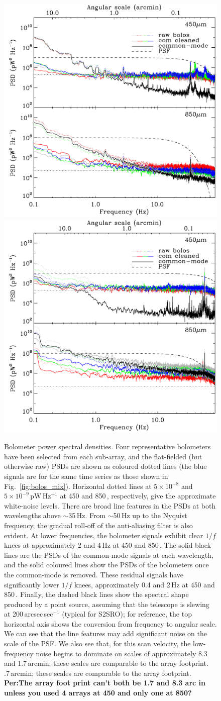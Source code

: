 \documentclass[useAMS,usenatbib,nofootinbib]{mn2e}
\begin{document}
\begin{figure}
\centering
\includegraphics[width=0.49\linewidth]{pspec_s2sro.pdf}
\includegraphics[width=0.49\linewidth]{pspec.pdf}
\caption{Bolometer power spectral densities. Four representative
  bolometers have been selected from each sub-array, and the
  flat-fielded (but otherwise raw) PSDs are shown as coloured dotted
  lines (the blue signals are for the same time series as those shown
  in Fig.~\ref{fig:bolos_mix}). Horizontal dotted lines at $5 \times
  10^{-8}$ and $5 \times 10^{-9}$\,pW\,Hz$^{-1}$ at 450 and
  850\,\micron, respectively, give the approximate white-noise
  levels. There are broad line features in the PSDs at both
  wavelengths above $\sim$35\,Hz. From $\sim$50\,Hz up to the Nyquist
  frequency, the gradual roll-off of the anti-aliasing filter is also
  evident.  At lower frequencies, the bolometer signals exhibit clear
  $1/f$ knees at approximately 2 and 4\,Hz at 450 and
  850\,\micron. The solid black lines are the PSDs of the common-mode
  signals at each wavelength, and the solid coloured lines show the
  PSDs of the bolometers once the common-mode is removed. These
  residual signals have significantly lower $1/f$ knees, approximately
  0.4 and 2\,Hz at 450 and 850\,\micron. Finally, the dashed black
  lines show the spectral shape produced by a point source, assuming
  that the telescope is slewing at 200\,arcsec\,sec$^{-1}$ (typical
  for S2SRO); for reference, the top horizontal axis shows the
  conversion from frequency to angular scale. We can see that the line
  features may add significant noise on the scale of the PSF. We also
  see that, for this scan velocity, the low-frequency noise begins to
  dominate on scales of approximately 8.3 and 1.7\,arcmin; these
  scales are comparable to the array footprint. .7\,arcmin; these
  scales are comparable to the array footprint. \bf{Per:The array foot
  print can't both be 1.7 and 8.3 arc in unless you used 4 arrays at
  450 and only one at 850?}}
\label{fig:pspec}
\end{figure}
\end{document}
